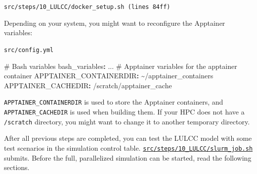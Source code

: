 \documentclass[
  letterpaper,
  DIV=11,
  numbers=noendperiod]{scrreprt}
\newenvironment{Shaded}{\begin{snugshade}}{\end{snugshade}}
\newcommand{\AttributeTok}[1]{\textcolor[rgb]{0.40,0.45,0.13}{#1}}
\newcommand{\CommentTok}[1]{\textcolor[rgb]{0.37,0.37,0.37}{#1}}
\newcommand{\DataTypeTok}[1]{\textcolor[rgb]{0.68,0.00,0.00}{#1}}
\newcommand{\ExtensionTok}[1]{\textcolor[rgb]{0.00,0.23,0.31}{#1}}
\newcommand{\FunctionTok}[1]{\textcolor[rgb]{0.28,0.35,0.67}{#1}}
\newcommand{\KeywordTok}[1]{\textcolor[rgb]{0.00,0.23,0.31}{\textbf{#1}}}
\newcommand{\NormalTok}[1]{\textcolor[rgb]{0.00,0.23,0.31}{#1}}
\newcommand{\StringTok}[1]{\textcolor[rgb]{0.13,0.47,0.30}{#1}}
\newcommand{\VariableTok}[1]{\textcolor[rgb]{0.07,0.07,0.07}{#1}}
\begin{document}
\begin{codelisting}

\caption{\texttt{src/steps/10\_LULCC/docker\_setup.sh (lines 84ff)}}

\begin{Shaded}
\end{Shaded}

\end{codelisting}

Depending on your system, you might want to reconfigure the Apptainer
variables:

\begin{codelisting}

\caption{\texttt{src/config.yml}}

\begin{Shaded}
\begin{Highlighting}[]
\CommentTok{\# Bash variables}
\FunctionTok{bash\_variables}\KeywordTok{:}
\AttributeTok{  ...}
\CommentTok{  \# Apptainer variables for the apptainer container}
\AttributeTok{  }\FunctionTok{APPTAINER\_CONTAINERDIR}\KeywordTok{:}\AttributeTok{ \textasciitilde{}/apptainer\_containers}
\AttributeTok{  }\FunctionTok{APPTAINER\_CACHEDIR}\KeywordTok{:}\AttributeTok{ /scratch/apptainer\_cache}
\end{Highlighting}
\end{Shaded}

\end{codelisting}

\texttt{APPTAINER\_CONTAINERDIR} is used to store the Apptainer
containers, and \texttt{APPTAINER\_CACHEDIR} is used when building them.
If your HPC does not have a \texttt{/scratch} directory, you might want
to change it to another temporary directory.

After all previous steps are completed, you can test the LULCC model
with some test scenarios in the simulation control table.
\href{https://github.com/cbueth/Future-EI/tree/main/src/steps/10_LULCC/slurm_job.sh}{\texttt{src/steps/10\_LULCC/slurm\_job.sh}}
submits. Before the full, parallelized simulation can be started, read
the following sections.
\end{document}
